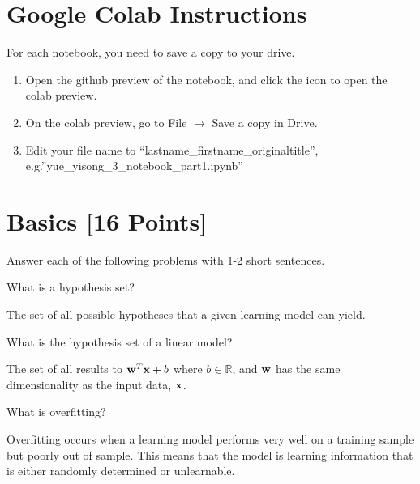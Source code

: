 \section*{Google Colab Instructions}

For each notebook, you need to save a copy to your drive.

\begin{enumerate}
	\item Open the github preview of the notebook, and click the icon to open the colab preview.
	\item On the colab preview, go to File $\rightarrow$ Save a copy in Drive.
	\item Edit your file name to “lastname_firstname_originaltitle”, e.g.”yue_yisong_3_notebook_part1.ipynb”
\end{enumerate}


\newpage
\section{Basics [16 Points]}

Answer each of the following problems with 1-2 short sentences.

\begin{problem}[2]
  What is a hypothesis set?
\end{problem}
\begin{solution}
  The set of all possible hypotheses that a given learning model
  can yield.
\end{solution}

\begin{problem}[2]
  What is the hypothesis set of a linear model?
\end{problem}
\begin{solution}
  The set of all results to $\bold{w}^T\bold{x} +b$
  where $b \in \mathbb{R}$, and $\bold{w}$ has the same 
  dimensionality as the input data, $\bold{x}$.
\end{solution}

\begin{problem}[2]
  What is overfitting?
\end{problem}
\begin{solution}
  Overfitting occurs when a learning model performs very well on
  a training sample but poorly out of sample. This means that
  the model is learning information that is either randomly
  determined or unlearnable.
\end{solution}

